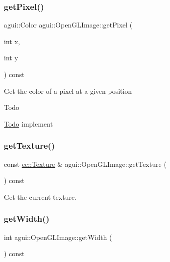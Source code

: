\subsubsection{\texorpdfstring{get\+Pixel()}{getPixel()}}
{\footnotesize\ttfamily agui\+::\+Color agui\+::\+Open\+G\+L\+Image\+::get\+Pixel (\begin{DoxyParamCaption}\item[{int}]{x,  }\item[{int}]{y }\end{DoxyParamCaption}) const\hspace{0.3cm}{\ttfamily [override]}}

Get the color of a pixel at a given position \begin{DoxyRefDesc}{Todo}
\item[\mbox{\hyperlink{todo__todo000007}{Todo}}]implement \end{DoxyRefDesc}
\mbox{\label{classagui_1_1_open_g_l_image_a7a2025b69dd0e462c8b46d97532d3036}} 
\subsubsection{\texorpdfstring{get\+Texture()}{getTexture()}}
{\footnotesize\ttfamily const \mbox{\hyperlink{classec_1_1_texture}{ec\+::\+Texture}} \& agui\+::\+Open\+G\+L\+Image\+::get\+Texture (\begin{DoxyParamCaption}{ }\end{DoxyParamCaption}) const}

Get the current texture. \mbox{\label{classagui_1_1_open_g_l_image_a065277a19487d6e5e961ba39706f8084}} 
\subsubsection{\texorpdfstring{get\+Width()}{getWidth()}}
{\footnotesize\ttfamily int agui\+::\+Open\+G\+L\+Image\+::get\+Width (\begin{DoxyParamCaption}{ }\end{DoxyParamCaption}) const\hspace{0.3cm}{\ttfamily [override]}}


